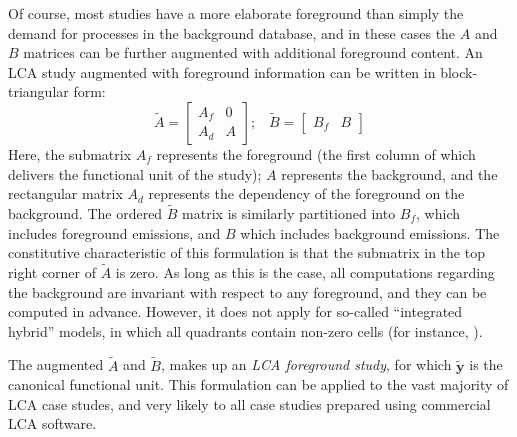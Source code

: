 
Of course, most studies have a more elaborate foreground than simply the demand for processes in the background database, and in these cases the $A$ and $B$ matrices can be further augmented with additional foreground content.  An LCA study augmented with foreground information can be written in block-triangular form:
\begin{equation}
\tilde{A} = \left[\begin{array}{cc}
A_f & 0 \\
A_d &  A
  \end{array}
\right];\;\;\;
  \tilde{B} = \left[\begin{array}{cc} B_f & B   \end{array}\right]
\label{eqn:foreground}
\end{equation}
Here, the submatrix $A_f$ represents the foreground (the first column of which delivers the functional unit of the study); $A$ represents the background, and the rectangular matrix $A_d$ represents the dependency of the foreground on the background.  The ordered $\tilde{B}$ matrix is similarly partitioned into $B_f$, which includes foreground emissions, and $B$ which includes background emissions. The constitutive characteristic of this formulation is that the submatrix in the top right corner of $\tilde{A}$ is zero.  As long as this is the case, all computations regarding the background are invariant with respect to any foreground, and they can be computed in advance. However, it does not apply for so-called ``integrated hybrid'' models, in which all quadrants contain non-zero cells (for instance, \cite{Gibon_2015}).


The augmented $\tilde{A}$ and $\tilde{B}$, makes up an \emph{LCA foreground study}, for which $\tilde{\mathbf{y}}$ is the canonical functional unit.  This formulation can be applied to the vast majority of LCA case studes, and very likely to all case studies prepared using commercial LCA software.  

